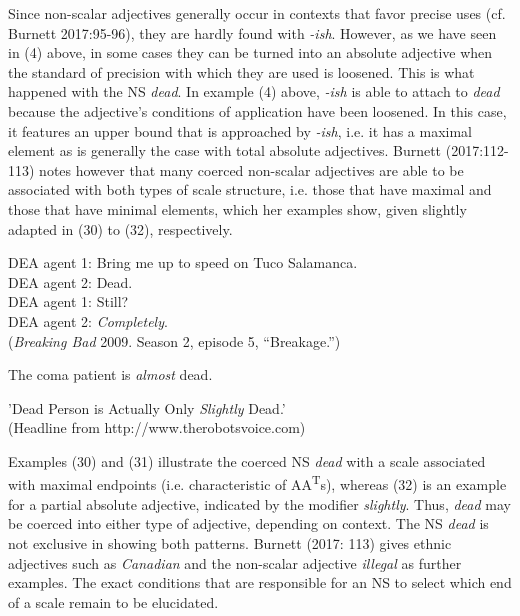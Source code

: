 \documentclass[output=paper
,modfonts
,nonflat]{langsci/langscibook}
\begin{document}
Since non-scalar adjectives generally occur in contexts that favor precise uses (cf. Burnett 2017:95-96), they are hardly found with \textit{-ish}. However, as we have seen in (4) above, in some cases they can be turned into an absolute adjective when the standard of precision with which they are used is loosened. This is what happened with the NS \textit{dead}. In example (4) above, \textit{-ish} is able to attach to \textit{dead} because the adjective's conditions of application have been loosened. In this case, it features an upper bound that is approached by \textit{-ish}, i.e. it has a maximal element as is generally the case with total absolute adjectives. Burnett (2017:112-113) notes however that many coerced non-scalar adjectives are able to be associated with both types of scale structure, i.e. those that have maximal and those that have minimal elements, which her examples show, given slightly adapted in (30) to (32), respectively.

\begin{examples}
	\item DEA agent 1: Bring me up to speed on Tuco Salamanca. \\
		DEA agent 2: Dead. \\
		DEA agent 1: Still? \\
		DEA agent 2: \textit{Completely}. \\
		(\textit{Breaking Bad} 2009. Season 2, episode 5, ``Breakage.'')
	\item The coma patient is \textit{almost} dead.
	\item 'Dead Person is Actually Only \textit{Slightly} Dead.' \\ 
		(Headline from http://www.therobotsvoice.com)
\end{examples}

Examples (30) and (31) illustrate the coerced NS \textit{dead} with a scale associated with maximal endpoints (i.e. characteristic of AA\textsuperscript{T}s), whereas (32) is an example for a partial absolute adjective, indicated by the modifier \textit{slightly}. Thus, \textit{dead} may be coerced into either type of adjective, depending on context. The NS \textit{dead} is not exclusive in showing both patterns. Burnett (2017: 113) gives ethnic adjectives such as \textit{Canadian} and the non-scalar adjective \textit{illegal} as further examples. The exact conditions that are responsible for an NS to select which end of a scale remain to be elucidated.
\end{document}
